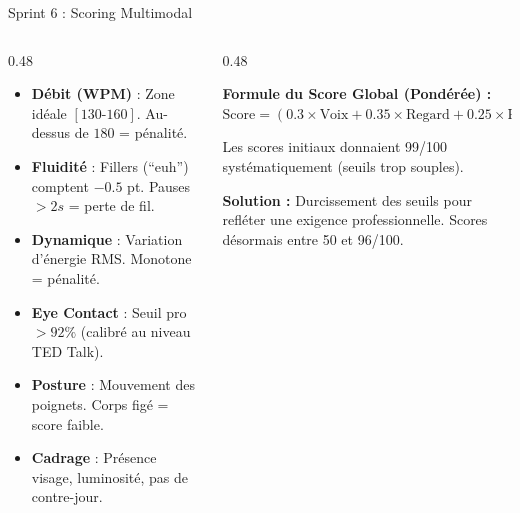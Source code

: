 \documentclass[10pt,aspectratio=169]{beamer}
\begin{document}
\begin{frame}{Sprint 6 : Scoring Multimodal}
    \begin{columns}[T]
        \begin{column}{0.48\textwidth}
            \begin{tcolorbox}[title=Axe Audio -- Voix \& Débit, colframe=primary, colback=primary!3]
                \scriptsize
                \begin{itemize}
                    \item \textbf{Débit (WPM)} : Zone idéale $[130\text{-}160]$. Au-dessus de $180$ = pénalité.
                    \item \textbf{Fluidité} : Fillers (``euh'') comptent $-0.5$ pt. Pauses $>2s$ = perte de fil.
                    \item \textbf{Dynamique} : Variation d'énergie RMS. Monotone = pénalité.
                \end{itemize}
            \end{tcolorbox}
            \begin{tcolorbox}[title=Axe Vision -- Corps \& Regard, colframe=accent, colback=accent!3]
                \scriptsize
                \begin{itemize}
                    \item \textbf{Eye Contact} : Seuil pro $>92\%$ (calibré au niveau TED Talk).
                    \item \textbf{Posture} : Mouvement des poignets. Corps figé = score faible.
                    \item \textbf{Cadrage} : Présence visage, luminosité, pas de contre-jour.
                \end{itemize}
            \end{tcolorbox}
        \end{column}
        \begin{column}{0.48\textwidth}
            \begin{imageframe}
                \footnotesize
                \textbf{Formule du Score Global (Pondérée) :}\\[0.2cm]
                \scriptsize
                $\text{Score} = (0.3 \times \text{Voix} + 0.35 \times \text{Regard} + 0.25 \times \text{Posture} + 0.1 \times \text{Scène}) \times 10$
            \end{imageframe}
            \vspace{0.3cm}
            \begin{tcolorbox}[colframe=danger!50, title=Problème résolu : Scores Irréalistes, colback=danger!3]
                \scriptsize
                Les scores initiaux donnaient 99/100 systématiquement (seuils trop souples).
                
                \textbf{Solution :} Durcissement des seuils pour refléter une exigence professionnelle. Scores désormais entre 50 et 96/100.
            \end{tcolorbox}
        \end{column}
    \end{columns}
\end{frame}
\end{document}
